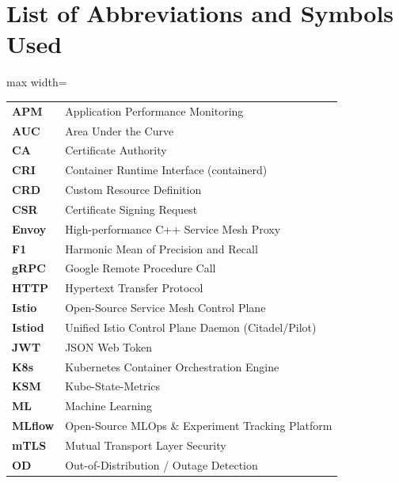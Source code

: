 \documentclass[12pt,a4paper]{report}
\begin{document}
\clearpage

\tableofcontents
\clearpage

\listoffigures
{}
\clearpage

\listoftables
{}
\clearpage

\chapter*{List of Abbreviations and Symbols Used}

\begin{adjustbox}{max width=\textwidth}
\begin{tabular}{p{3.2cm}p{11cm}}
\textbf{APM} & Application Performance Monitoring \\
\textbf{AUC} & Area Under the Curve \\
\textbf{CA} & Certificate Authority \\
\textbf{CRI} & Container Runtime Interface (containerd) \\
\textbf{CRD} & Custom Resource Definition \\
\textbf{CSR} & Certificate Signing Request \\
\textbf{Envoy} & High-performance C++ Service Mesh Proxy \\
\textbf{F1} & Harmonic Mean of Precision and Recall \\
\textbf{gRPC} & Google Remote Procedure Call \\
\textbf{HTTP} & Hypertext Transfer Protocol \\
\textbf{Istio} & Open-Source Service Mesh Control Plane \\
\textbf{Istiod} & Unified Istio Control Plane Daemon (Citadel/Pilot) \\
\textbf{JWT} & JSON Web Token \\
\textbf{K8s} & Kubernetes Container Orchestration Engine \\
\textbf{KSM} & Kube-State-Metrics \\
\textbf{ML} & Machine Learning \\
\textbf{MLflow} & Open-Source MLOps \& Experiment Tracking Platform \\
\textbf{mTLS} & Mutual Transport Layer Security \\
\textbf{OD} & Out-of-Distribution / Outage Detection \\

\end{tabular}
\end{adjustbox}
\end{document}
